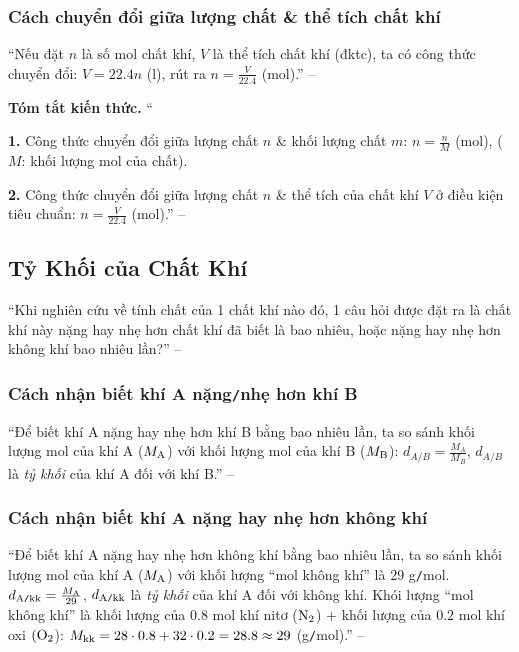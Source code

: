 \documentclass{article}
\numberwithin{equation}{section}
\begin{document}
\subsubsection{Cách chuyển đổi giữa lượng chất \& thể tích chất khí}
``Nếu đặt $n$ là số mol chất khí, $V$ là thể tích chất khí (đktc), ta có công thức chuyển đổi: $V = 22.4n$ (l), rút ra $n = \frac{V}{22.4}$ (mol).'' -- \cite[p. 66]{SGK_Hoa_Hoc_8}
\vspace{2mm}

\noindent\textbf{Tóm tắt kiến thức.}
``\begin{enumerate*}
	\item[\textbf{1.}] Công thức chuyển đổi giữa lượng chất $n$ \& khối lượng chất $m$: $n = \frac{n}{M}$ (mol), ($M$: khối lượng mol của chất).
	\item[\textbf{2.}] Công thức chuyển đổi giữa lượng chất $n$ \& thể tích của chất khí $V$ ở điều kiện tiêu chuẩn: $n = \frac{V}{22.4}$ (mol).'' -- \cite[p. 67]{SGK_Hoa_Hoc_8}
\end{enumerate*}


\subsection{Tỷ Khối của Chất Khí}
``Khi nghiên cứu về tính chất của 1 chất khí nào đó, 1 câu hỏi được đặt ra là chất khí này nặng hay nhẹ hơn chất khí đã biết là bao nhiêu, hoặc nặng hay nhẹ hơn không khí bao nhiêu lần?'' -- \cite[p. 68]{SGK_Hoa_Hoc_8}

\subsubsection{Cách nhận biết khí A nặng\texttt{/}nhẹ hơn khí B}
``Để biết khí A nặng hay nhẹ hơn khí B bằng bao nhiêu lần, ta so sánh khối lượng mol của khí A ($M_{\rm A}$) với khối lượng mol của khí B ($M_{\rm B}$): $d_{A\texttt{/}B} = \frac{M_A}{M_B}$, $d_{A\texttt{/}B}$ là \textit{tỷ khối} của khí A đối với khí B.'' -- \cite[p. 68]{SGK_Hoa_Hoc_8}

\subsubsection{Cách nhận biết khí A nặng hay nhẹ hơn không khí}
``Để biết khí A nặng hay nhẹ hơn không khí bằng bao nhiêu lần, ta so sánh khối lượng mol của khí A ($M_{\rm A}$) với khối lượng ``mol không khí'' là 29 g\texttt{/}mol. $d_{\rm A\texttt{/}kk} = \frac{M_{\rm A}}{29}$, $d_{\rm A\texttt{/}kk}$ là \textit{tỷ khối} của khí A đối với không khí. Khói lượng ``mol không khí'' là khối lượng của $0.8$ mol khí nitơ ($\rm N_2$) $+$ khối lượng của $0.2$ mol khí oxi $(\rm O_2$): $M_{\rm kk} = 28\cdot 0.8 + 32\cdot 0.2 = 28.8\approx 29$ (g\texttt{/}mol).'' -- \cite[p. 68]{SGK_Hoa_Hoc_8}
\vspace{2mm}
\end{document}
